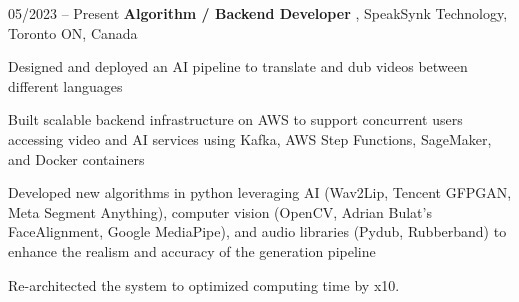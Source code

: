 \begin{twocolentry}{
    05/2023 – Present
}
    \textbf{Algorithm / Backend Developer }, SpeakSynk Technology, Toronto ON, Canada\end{twocolentry}

\vspace{0.10 cm}
\begin{onecolentry}
    \begin{highlights}
        \item Designed and deployed an AI pipeline to translate and dub videos between different languages  
        \item Built scalable backend infrastructure on AWS to support concurrent users accessing video and AI services using Kafka, AWS Step Functions, SageMaker, and Docker containers 
        \item Developed new algorithms in python leveraging AI (Wav2Lip, Tencent GFPGAN, Meta Segment Anything), computer vision (OpenCV, Adrian Bulat’s FaceAlignment, Google MediaPipe), and audio libraries (Pydub, Rubberband) to enhance the realism and accuracy of the generation pipeline 
        \item Re-architected the system to optimized computing time by x10.
    \end{highlights}
\end{onecolentry}